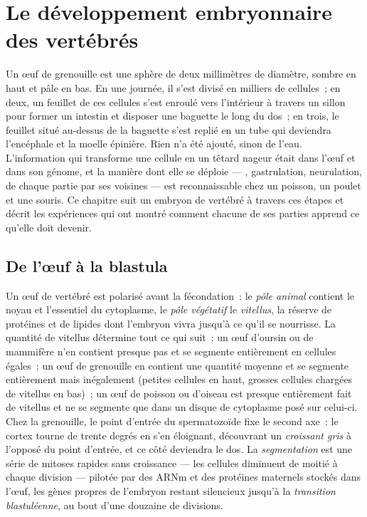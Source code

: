 \chapter{Le développement embryonnaire des vertébrés}\label{ch:b2:vertebrate-development}

Un œuf de grenouille est une sphère de deux millimètres de diamètre,
sombre en haut et pâle en bas. En une journée, il s'est divisé en
milliers de cellules~; en deux, un feuillet de ces cellules s'est
enroulé vers l'intérieur à travers un sillon pour former un intestin et
disposer une baguette le long du dos~; en trois, le feuillet situé
au-dessus de la baguette s'est replié en un tube qui deviendra
l'encéphale et la moelle épinière. Rien n'a été ajouté, sinon de l'eau.
L'information qui transforme une cellule en un têtard nageur était dans
l'œuf et dans son génome, et la manière dont elle se déploie ---
, gastrulation, neurulation,  de chaque partie par
ses voisines --- est reconnaissable chez un poisson, un poulet et une
souris. Ce chapitre suit un embryon de vertébré à travers ces étapes et
décrit les expériences qui ont montré comment chacune de ses parties
apprend ce qu'elle doit devenir.

\section{De l'œuf à la blastula}

\begin{definition}\label{def:b2:vertebrate-development:egg}
Un œuf de vertébré est polarisé avant la fécondation~: le \emph{pôle
animal} contient le noyau et l'essentiel du cytoplasme, le \emph{pôle
végétatif} le \emph{vitellus}, la réserve de protéines et de lipides
dont l'embryon vivra jusqu'à ce qu'il se nourrisse. La quantité de
vitellus détermine tout ce qui suit~: un œuf d'oursin ou de mammifère
n'en contient presque pas et se segmente entièrement en cellules
égales~; un œuf de grenouille en contient une quantité moyenne et se
segmente entièrement mais inégalement (petites cellules en haut,
grosses cellules chargées de vitellus en bas)~; un œuf de poisson ou
d'oiseau est presque entièrement fait de vitellus et ne se segmente que
dans un disque de cytoplasme posé sur celui-ci. Chez la grenouille, le
point d'entrée du spermatozoïde fixe le second axe~: le cortex tourne de
trente degrés en s'en éloignant, découvrant un \emph{croissant gris} à
l'opposé du point d'entrée, et ce côté deviendra le dos. La
\emph{segmentation} est une série de mitoses rapides sans croissance ---
les cellules diminuent de moitié à chaque division --- pilotée par des
ARNm et des protéines maternels stockés dans l'œuf, les gènes propres
de l'embryon restant silencieux jusqu'à la \emph{transition
blastuléenne}, au bout d'une douzaine de divisions.
\end{definition}

